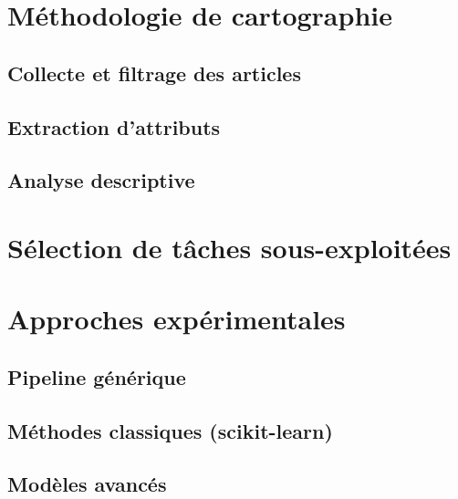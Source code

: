 \documentclass{article}
\begin{document}
\section{Méthodologie de cartographie}
\subsection{Collecte et filtrage des articles}
\subsection{Extraction d'attributs}
\subsection{Analyse descriptive}

\section{Sélection de tâches sous-exploitées}

\section{Approches expérimentales}
\subsection{Pipeline générique}
\subsection{Méthodes classiques (scikit-learn)}
\subsection{Modèles avancés}
\end{document}
